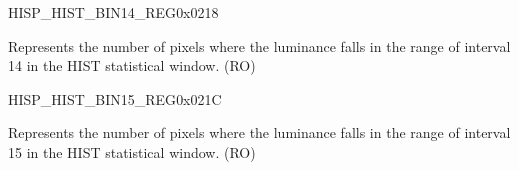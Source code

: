 \begin{register}{H}{ISP\_HIST\_BIN14\_REG}{0x0218}\label{regdesc:ISPHISTBIN14REG}
%
%
\regnewline%
\begin{regdesc}\begin{reglist}
\label{fielddesc:ISPHISTBIN14}\item [ISP\_HIST\_BIN\_14] Represents the number of pixels where the luminance falls in the range of interval 14 in the HIST statistical window. (RO)
\end{reglist}\end{regdesc}
\end{register}


\begin{register}{H}{ISP\_HIST\_BIN15\_REG}{0x021C}\label{regdesc:ISPHISTBIN15REG}
%
%
\regnewline%
\begin{regdesc}\begin{reglist}
\label{fielddesc:ISPHISTBIN15}\item [ISP\_HIST\_BIN\_15] Represents the number of pixels where the luminance falls in the range of interval 15 in the HIST statistical window. (RO)
\end{reglist}\end{regdesc}
\end{register}


